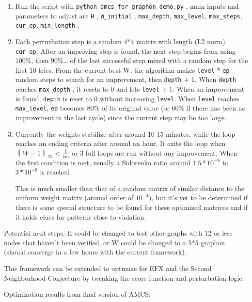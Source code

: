 \documentclass[
  letterpaper,
  DIV=11,
  numbers=noendperiod]{scrartcl}
\begin{document}
\begin{enumerate}
\def\labelenumi{\arabic{enumi}.}
\item
  Run the script with \texttt{python\ amcs\_for\_graphon\_demo.py} ,
  main inputs and parameters to adjust are \texttt{H} ,
  \texttt{W\_initial} , \texttt{max\_depth}, \texttt{max\_level},
  \texttt{max\_steps}, \texttt{cur\_ep}, \texttt{min\_length} .
\item
  Each perturbation step is a random 4*4 matrix with length (L2 norm)
  \texttt{cur\_ep}. After an improving step is found, the next step
  begins from using 100\%, then 90\%\ldots{} of the last successful step
  mixed with a random step for the first 10 tries. From the current best
  W, the algorithm makes \texttt{level} * \texttt{ep} random steps to
  search for an improvement, then \texttt{depth} + 1. When
  \texttt{depth} reaches \texttt{max\_depth} , it resets to 0 and lets
  \texttt{level} + 1. When an improvement is found, \texttt{depth} is
  reset to 0 without increasing \texttt{level}. When \texttt{level}
  reaches \texttt{max\_level}, \texttt{ep} becomes 80\% of its original
  value (or 60\% if there has been no improvement in the last cycle)
  since the current step may be too large.
\item
  Currently the weights stabilize after around 10-15 minutes, while the
  loop reaches an ending criteria after around an hour. It exits the
  loop when \(\left \lVert W - 1 \right \rVert_\infty < \frac{1}{4m}\)
  or 3 full loops are run without any improvement. When the first
  condition is met, usually a Sidorenko ratio around \(1.5*10^{-8}\) to
  \(3* 10^{-8}\) is reached.

  This is much smaller than that of a random matrix of similar distance
  to the uniform weight matrix (around order of \(10^{-4}\)), but it's
  yet to be determined if there is some special structure to be found
  for these optimized matrices and if it holds clues for patterns close
  to violation.
\end{enumerate}

Potential next steps: H could be changed to test other graphs with 12 or
less nodes that haven't been verified, or W could be changed to a 5*5
graphon (should converge in a few hours with the current framework).

This framework can be extended to optimize for EFX and the Second
Neighborhood Conjecture by tweaking the score function and perturbation
logic.

Optimization results from final version of AMCS:
\end{document}
